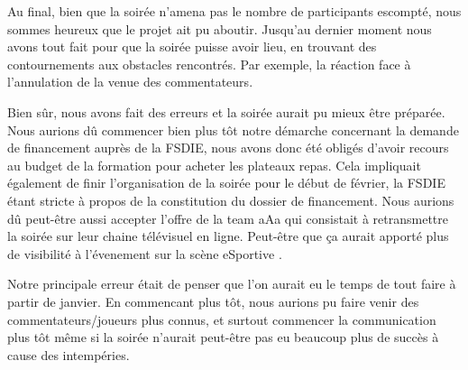 Au final, bien que la soirée n'amena pas le nombre de participants
escompté, nous sommes heureux que le projet ait pu aboutir.  Jusqu'au
dernier moment nous avons tout fait pour que la soirée puisse avoir
lieu, en trouvant des contournements aux obstacles rencontrés. Par
exemple, la réaction face à l'annulation de la venue des commentateurs.

Bien sûr, nous avons fait des erreurs et la soirée aurait pu mieux être
préparée. Nous aurions dû commencer bien plus tôt notre démarche
concernant la demande de financement auprès de la FSDIE, nous avons donc
été obligés d'avoir recours au budget de la formation pour acheter les
plateaux repas. Cela impliquait également de finir l'organisation de la
soirée pour le début de février, la FSDIE étant stricte à propos de la
constitution du dossier de financement. Nous aurions dû peut-être aussi
accepter l'offre de la team \og aAa \fg{} qui consistait à retransmettre
la soirée sur leur chaine télévisuel en ligne. Peut-être que ça aurait
apporté plus de visibilité à l'évenement sur la scène \og eSportive
\fg{}.

Notre principale erreur était de penser que l'on aurait eu le temps de
tout faire à partir de janvier. En commencant plus tôt, nous aurions pu
faire venir des commentateurs/joueurs plus connus, et surtout commencer
la communication plus tôt même si la soirée n'aurait peut-être pas eu
beaucoup plus de succès à cause des intempéries.
